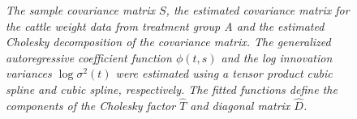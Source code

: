 \begin{figure}[H]
 \caption{\textit{The sample covariance matrix $S$, the estimated covariance matrix for the cattle weight data from treatment group A and the estimated Cholesky decomposition of the covariance matrix. The generalized autoregressive coefficient function $\phi\left(t,s\right)$ and the log innovation variances $\log \sigma^2\left(t\right)$ were estimated using a tensor product cubic spline and cubic spline, respectively. The fitted functions define the components of the Cholesky factor $\hat{T}$ and diagonal matrix $\hat{D}$.}}  \label{fig:fitted-cholesky-decomposition-cattle-date}
\end{figure}


